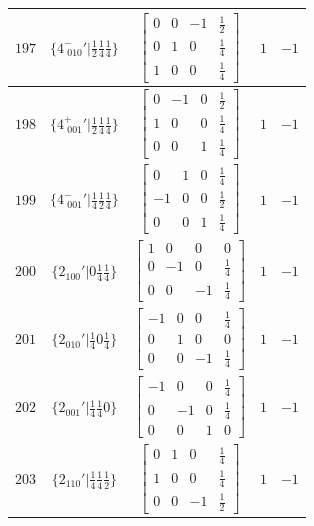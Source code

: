 \documentclass[fleqn,8pt]{jsarticle}
\begin{document}
\begin{longtable}{ccccc}
$ 197 $ & $ \{4^{-}_{\,\,010}{}'|\frac{1}{2} \frac{1}{4} \frac{1}{4}\} $ & $ \begin{bmatrix} 0 & 0 & -1 & \frac{1}{2} \\ 0 & 1 & 0 & \frac{1}{4} \\ 1 & 0 & 0 & \frac{1}{4} \end{bmatrix} $ & $ 1 $ & $ -1 $ \\ \hline
$ 198 $ & $ \{4^{+}_{\,\,001}{}'|\frac{1}{2} \frac{1}{4} \frac{1}{4}\} $ & $ \begin{bmatrix} 0 & -1 & 0 & \frac{1}{2} \\ 1 & 0 & 0 & \frac{1}{4} \\ 0 & 0 & 1 & \frac{1}{4} \end{bmatrix} $ & $ 1 $ & $ -1 $ \\ \hline
$ 199 $ & $ \{4^{-}_{\,\,001}{}'|\frac{1}{4} \frac{1}{2} \frac{1}{4}\} $ & $ \begin{bmatrix} 0 & 1 & 0 & \frac{1}{4} \\ -1 & 0 & 0 & \frac{1}{2} \\ 0 & 0 & 1 & \frac{1}{4} \end{bmatrix} $ & $ 1 $ & $ -1 $ \\ \hline
$ 200 $ & $ \{2{}_{100}{}'|0 \frac{1}{4} \frac{1}{4}\} $ & $ \begin{bmatrix} 1 & 0 & 0 & 0 \\ 0 & -1 & 0 & \frac{1}{4} \\ 0 & 0 & -1 & \frac{1}{4} \end{bmatrix} $ & $ 1 $ & $ -1 $ \\ \hline
$ 201 $ & $ \{2{}_{010}{}'|\frac{1}{4} 0 \frac{1}{4}\} $ & $ \begin{bmatrix} -1 & 0 & 0 & \frac{1}{4} \\ 0 & 1 & 0 & 0 \\ 0 & 0 & -1 & \frac{1}{4} \end{bmatrix} $ & $ 1 $ & $ -1 $ \\ \hline
$ 202 $ & $ \{2{}_{001}{}'|\frac{1}{4} \frac{1}{4} 0\} $ & $ \begin{bmatrix} -1 & 0 & 0 & \frac{1}{4} \\ 0 & -1 & 0 & \frac{1}{4} \\ 0 & 0 & 1 & 0 \end{bmatrix} $ & $ 1 $ & $ -1 $ \\ \hline
$ 203 $ & $ \{2{}_{110}{}'|\frac{1}{4} \frac{1}{4} \frac{1}{2}\} $ & $ \begin{bmatrix} 0 & 1 & 0 & \frac{1}{4} \\ 1 & 0 & 0 & \frac{1}{4} \\ 0 & 0 & -1 & \frac{1}{2} \end{bmatrix} $ & $ 1 $ & $ -1 $ \\ \hline

\end{longtable}
\end{document}
